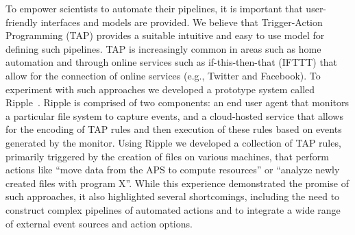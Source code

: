 \documentclass{aip-cp}
\begin{document}
To empower scientists to automate their pipelines, it is important that
user-friendly interfaces and models are provided. We believe that 
Trigger-Action Programming (TAP) provides a suitable intuitive and 
easy to use model for defining such pipelines. TAP is increasingly
common in areas such as home automation and through online services
such as if-this-then-that (IFTTT) that allow for the connection
of online services (e.g., Twitter and Facebook). To experiment
with such approaches we developed a prototype system called 
Ripple~\cite{chard17ripple}. Ripple is comprised of two components: an 
end user agent that monitors a particular file system to capture events, 
and a cloud-hosted service that allows for the encoding of TAP rules
and then execution of these rules based on events generated by the monitor.
Using Ripple we developed a collection of TAP rules, primarily
triggered by the creation of files on various 
machines, that perform actions like ``move data from the APS to
compute resources'' or ``analyze newly created files with program X''. 
While this experience demonstrated the promise of such approaches, 
it also highlighted several shortcomings, including the need 
to construct complex pipelines of automated actions and to integrate
a wide range of external event sources and action options.
 

\end{document}
